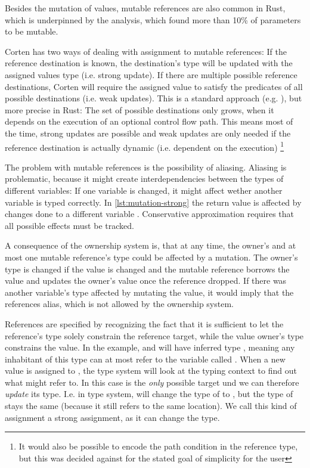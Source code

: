 \documentclass[twoside, english]{sdqthesis}
\theoremstyle{definition}
\begin{document}
Besides the mutation of values, mutable references are also common in Rust, which is underpinned by the analysis, which found more than 10\% of parameters to be mutable.

Corten has two ways of dealing with assignment to mutable references: If the reference destination is known, the destination's type will be updated with the assigned values type (i.e. strong update). If there are multiple possible reference destinations, Corten will require the assigned value to satisfy the predicates of all possible destinations (i.e. weak updates). This is a standard approach (e.g. \cite{kloos_asynchronous_2015}), but more precise in Rust: The set of possible destinations only grows, when it depends on the execution of an optional control flow path. This means most of the time, strong updates are possible and weak updates are only needed if the reference destination is actually dynamic (i.e. dependent on the execution) \footnote{It would also be possible to encode the path condition in the reference type, but this was decided against for the stated goal of simplicity for the user}

The problem with mutable references is the possibility of aliasing. Aliasing is problematic, because it might create interdependencies between the types of different variables: If one variable is changed, it might affect wether another variable is typed correctly. In \cref{lst:mutation-strong} the return value  is affected by changes done to a different variable . Conservative approximation requires that all possible effects must be tracked. 

A consequence of the ownership system is, that at any time, the owner's and at most one mutable reference's type could be affected by a mutation. The owner's type is changed if the value is changed and the mutable reference borrows the value and updates the owner's value once the reference dropped. If there was another variable's type affected by mutating the value, it would imply that the references alias, which is not allowed by the ownership system.

References are specified by recognizing the fact that it is sufficient to let the reference's type solely constrain the reference target, while the value owner's type constrains the value.
In the example,  and  will have inferred type , meaning any inhabitant of this type can at most refer to the variable called .
When a new value is assigned to , the type system will look at the typing context to find out what  might refer to. In this case  is the \textit{only} possible target und we can therefore \textit{update} its type. I.e. in type system,  will change the type of  to , but the type of  stays the same (because it still refers to the same location). We call this kind of assignment a strong assignment, as it can change the type. 
\end{document}
